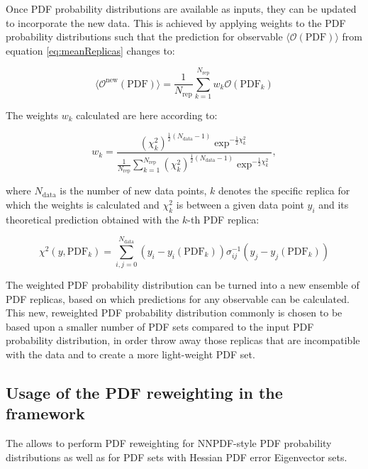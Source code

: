 Once PDF probability distributions are available as inputs, they can be updated to incorporate the new data. This is achieved by applying weights to the PDF probability distributions such that the prediction for observable $\langle\mathcal{O}(\mathrm{PDF})\rangle$ from equation \ref{eq:meanReplicas} changes to:

\begin{equation}
 \langle\mathcal{O}^{\mathrm{new}}(\mathrm{PDF})\rangle = \frac{1}{N_{\mathrm{rep}}} \sum_{k=1}^{N_{\mathrm{rep}}} w_k \mathcal{O}(\mathrm{PDF}_k)
\end{equation}

The weights $w_k$ calculated are here according to:

\begin{equation}
 w_k = \frac{(\chi^2_k)^{\frac{1}{2} (N_{\mathrm{data}}-1) } \exp^{-\frac{1}{2}\chi^2_k}}{ \frac{1}{N_{\mathrm{rep}}} \sum^{N_{\mathrm{rep}}}_{k=1}(\chi^2_k)^{\frac{1}{2}(N_{\mathrm{data}}-1)} \exp^{-\frac{1}{2}\chi^2_k}  },
\end{equation}

where $N_{\mathrm{data}}$ is the number of new data points, $k$ denotes the specific replica for which the weights is calculated and $\chi^2_k$ is between a given data point $y_i$ and its theoretical prediction obtained with the $k$-th PDF replica:

\begin{equation}
 \chi^2 (y,\mathrm{PDF}_k) = \sum_{i,j=0}^{N_{\mathrm{data}}} (y_i - y_i(\mathrm{PDF}_k)) \sigma^{-1}_{ij} (y_j-y_j(\mathrm{PDF}_k))  
\end{equation}

The weighted PDF probability distribution can be turned into a new ensemble of PDF replicas, based on which predictions for any observable can be calculated. This new, reweighted PDF probability distribution commonly is chosen to be based upon a smaller number of PDF sets compared to the input PDF probability distribution, in order throw away those replicas that are incompatible with the data and to create a more light-weight PDF set. 


\subsection{Usage of the PDF reweighting in the \fitter framework}
 
The \fitter allows to perform PDF reweighting for NNPDF-style PDF probability distributions as well as for PDF sets with Hessian PDF error Eigenvector sets. 

